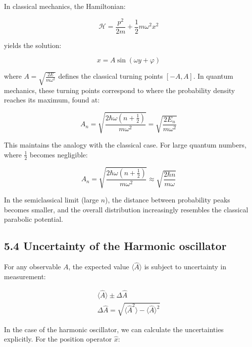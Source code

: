 \documentclass[italian]{HKNdocument}
\begin{document}
In classical mechanics, the Hamiltonian:

\begin{equation*}
\mathcal{H} = \frac{p^2}{2m} + \frac{1}{2}m\omega^2 x^2 \tag{5.55}
\end{equation*}

yields the solution:

\begin{equation*}
x = A\sin(\omega y + \varphi) \tag{5.56}
\end{equation*}

where $A = \sqrt{\frac{2E}{m\omega^2}}$ defines the classical turning points $[-A,A]$. In quantum mechanics, these turning points correspond to where the probability density reaches its maximum, found at:

\begin{equation*}
A_n = \sqrt{\frac{2\hbar\omega(n+\frac{1}{2})}{m\omega^2}} = \sqrt{\frac{2E_n}{m\omega^2}} \tag{5.57}
\end{equation*}

This maintains the analogy with the classical case. For large quantum numbers, where $\frac{1}{2}$ becomes negligible:

\begin{equation*}
A_n = \sqrt{\frac{2\hbar\omega(n+\frac{1}{2})}{m\omega^2}} \approx \sqrt{\frac{2\hbar n}{m\omega}} \tag{5.58}
\end{equation*}

In the semiclassical limit (large $n$), the distance between probability peaks becomes smaller, and the overall distribution increasingly resembles the classical parabolic potential.

\subsection*{5.4 Uncertainty of the Harmonic oscillator}

For any observable $\hat{A}$, the expected value $\langle\hat{A}\rangle$ is subject to uncertainty in measurement:

\begin{gather*}
\langle\hat{A}\rangle \pm \Delta\hat{A} \tag{5.59} \\
\Delta\hat{A} = \sqrt{\langle\hat{A}^2\rangle - \langle\hat{A}\rangle^2} \tag{5.60}
\end{gather*}


In the case of the harmonic oscillator, we can calculate the uncertainties explicitly. For the position operator $\hat{x}$:
\end{document}
